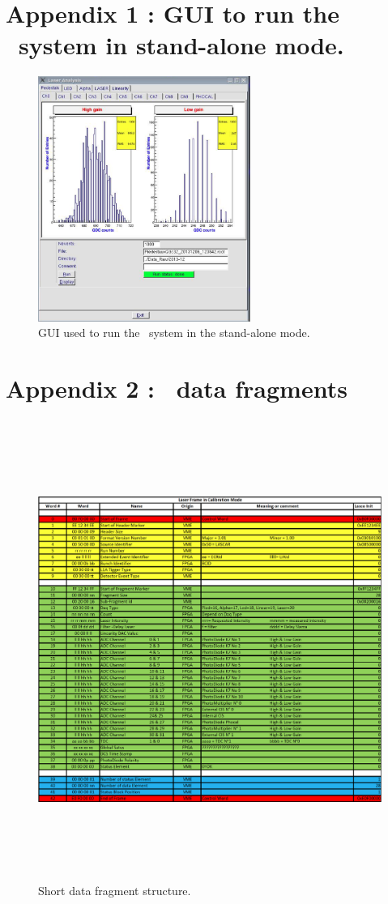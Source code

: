 
\part*{Appendix 1 : GUI to run the \lasii~system in stand-alone mode.}
\label{app:a}
\begin{figure}[htbp]
\centering
\includegraphics[height=8cm]{figures/Stand_alone_GUI}
\caption{GUI used to run the \lasii~system in the stand-alone mode.}\label{fig:lasstandgui}
\end{figure}

\newpage

\part*{Appendix 2 : \lasii~data fragments}
\label{app:b}

\begin{figure}[htbp]
\centering
\includegraphics[height=15cm]{figures/short_fragment.pdf}
\caption{Short data fragment structure.}\label{fig:shortfrag}
\end{figure}


